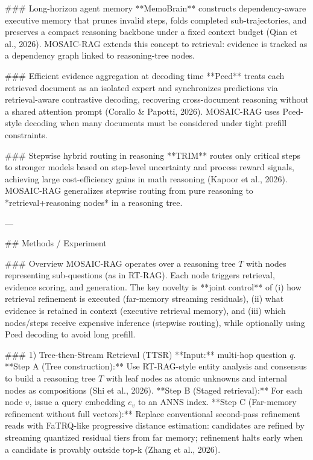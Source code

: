 ### Long-horizon agent memory  
**MemoBrain** constructs dependency-aware executive memory that prunes invalid steps, folds completed sub-trajectories, and preserves a compact reasoning backbone under a fixed context budget (Qian et al., 2026). MOSAIC-RAG extends this concept to retrieval: evidence is tracked as a dependency graph linked to reasoning-tree nodes.

### Efficient evidence aggregation at decoding time  
**Pced** treats each retrieved document as an isolated expert and synchronizes predictions via retrieval-aware contrastive decoding, recovering cross-document reasoning without a shared attention prompt (Corallo & Papotti, 2026). MOSAIC-RAG uses Pced-style decoding when many documents must be considered under tight prefill constraints.

### Stepwise hybrid routing in reasoning  
**TRIM** routes only critical steps to stronger models based on step-level uncertainty and process reward signals, achieving large cost-efficiency gains in math reasoning (Kapoor et al., 2026). MOSAIC-RAG generalizes stepwise routing from pure reasoning to *retrieval+reasoning nodes* in a reasoning tree.

---

## Methods / Experiment  

### Overview  
MOSAIC-RAG operates over a reasoning tree \(T\) with nodes representing sub-questions (as in RT-RAG). Each node triggers retrieval, evidence scoring, and generation. The key novelty is **joint control** of (i) how retrieval refinement is executed (far-memory streaming residuals), (ii) what evidence is retained in context (executive retrieval memory), and (iii) which nodes/steps receive expensive inference (stepwise routing), while optionally using Pced decoding to avoid long prefill.

### 1) Tree-then-Stream Retrieval (TTSR)  
**Input:** multi-hop question \(q\).  
**Step A (Tree construction):** Use RT-RAG-style entity analysis and consensus to build a reasoning tree \(T\) with leaf nodes as atomic unknowns and internal nodes as compositions (Shi et al., 2026).  
**Step B (Staged retrieval):** For each node \(v\), issue a query embedding \(e_v\) to an ANNS index.  
**Step C (Far-memory refinement without full vectors):** Replace conventional second-pass refinement reads with FaTRQ-like progressive distance estimation: candidates are refined by streaming quantized residual tiers from far memory; refinement halts early when a candidate is provably outside top-k (Zhang et al., 2026).  

